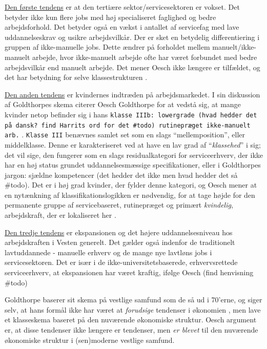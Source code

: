 \underline{Den første tendens} er at den tertiære sektor/servicesektoren er vokset. Det betyder ikke kun flere jobs med høj specialiseret faglighed og bedre arbejdsforhold.  Det betyder også en vækst i antallet af servicefag med lave uddannelseskrav og usikre arbejdsvilkår. Der er sket en betydelig differentiering i gruppen af ikke-manuelle jobs. Dette ændrer på forholdet mellem manuelt/ikke-manuelt arbejde, hvor ikke-manuelt arbejde ofte har været forbundet med bedre arbejdsvilkår end manuelt arbejde. Det mener Oesch ikke længere er tilfældet, og det har betydning for selve klassestrukturen \parencite[47]{Oesch2006a}. 

\underline{Den anden tendens} er kvindernes indtræden på arbejdsmarkedet. I sin diskussion af Goldthorpes skema citerer Oesch Goldthorpe for at vedstå sig, at mange kvinder netop befinder sig i hans \texttt{klasse IIIb: lowergrade (hvad hedder det på dansk? find Harrits ord for det \#todo) rutinepræget ikke-manuelt arb.} \parencite[44]{Oesch2006a}. \texttt{Klasse III} benævnes samlet set som en slags “mellemposition”, eller middelklasse. Denne er karakteriseret ved at have en lav grad af “\emph{klassehed}” i sig; det vil sige, den fungerer som en slags residualkategori for serviceerhverv, der ikke har en høj status grundet uddannelsesmæssige specifikationer, eller i Goldthorpes jargon: sjældne kompetencer (det hedder det ikke men hvad hedder det så \#todo). Det er i høj grad kvinder, der fylder denne kategori, og Oesch mener at en nytænkning af klassifikationslogikken er nødvendig, for at tage højde for den permanente gruppe af servicebaseret, rutinepræget og primært \emph{kvindelig}, arbejdskraft, der er lokaliseret her \parencite[45]{Oesch2006a}. 

\underline{Den tredje tendens} er ekspansionen og det højere uddannelsesniveau hos arbejdskraften i Vesten generelt. Det gælder også indenfor de traditionelt lavtuddannede - manuelle erhverv og de mange nye lavtløns jobs i servicesektoren. Det er især i de ikke-universitetsbaserede, erhvervsrettede serviceerhverv, at ekspansionen har været kraftig, ifølge Oesch (find henvisning \#todo)

Goldthorpe baserer sit skema på vestlige samfund som de så ud i 70'erne, og siger selv, at hans formål ikke har været at \emph{forudsige} tendenser i økonomien \parencite[48]{Oesch2006a}, men lave et klasseskema baseret på den nuværende økonomiske struktur. Oesch argument er, at disse tendenser ikke længere er tendenser, men \emph{er blevet} til den nuværende økonomiske struktur i (sen)moderne vestlige samfund. 

